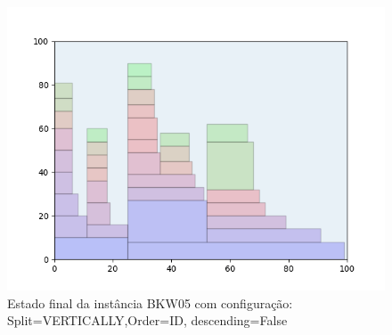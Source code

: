 \begin{figure}[H]
    \centering
    \caption[]{Estado final da instância BKW05 com configuração: Split=VERTICALLY,Order=ID, descending=False}
    \label{fig:bkw05-vertically-id-false}
    \includegraphics[scale=0.5]{output/figures/bkw/bkw05/vertically/id/false/00}
\end{figure}